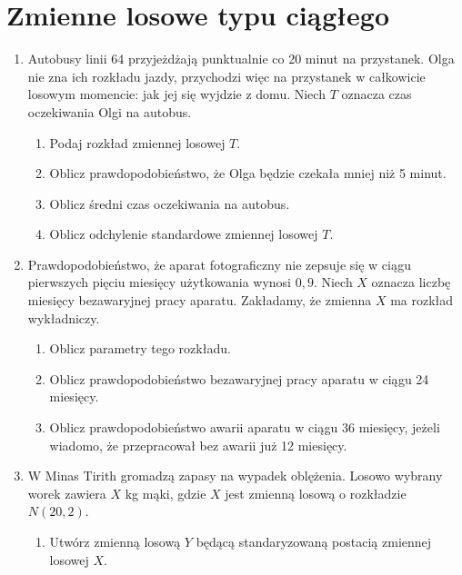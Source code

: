 \documentclass{mwart}
\newcommand{\ans}[1]{}
\newcommand{\ans}[1]{\emph{Odpowiedź:} #1}
\begin{document}
\clearpage
\section{Zmienne losowe typu ciągłego}
\begin{enumerate}
\item Autobusy linii 64 przyjeżdżają punktualnie co 20 minut na przystanek. Olga nie zna ich rozkładu jazdy, przychodzi więc na przystanek w całkowicie losowym momencie: jak jej się wyjdzie z domu. Niech $T$ oznacza czas oczekiwania Olgi na autobus.
\begin{enumerate}
\item Podaj rozkład zmiennej losowej $T$. \ans{$f(t)=\begin{cases}\frac{1}{20} & 0\leq t\leq 20 \\ 0 & \text{wpp} \end{cases}$}
\item Oblicz prawdopodobieństwo, że Olga będzie czekała mniej niż 5 minut. \ans{$P(T<5)=F(5)=0{,}25$}
\item Oblicz średni czas oczekiwania na autobus. \ans{$ET=10$}
\item Oblicz odchylenie standardowe zmiennej losowej $T$. \ans{$DT=\sqrt{\frac{400}{12}}$}
\end{enumerate}
\item Prawdopodobieństwo, że aparat fotograficzny nie zepsuje się w ciągu pierwszych pięciu miesięcy użytkowania wynosi $0{,}9$. Niech $X$ oznacza liczbę miesięcy bezawaryjnej pracy aparatu. Zakładamy, że zmienna $X$ ma rozkład wykładniczy.
\begin{enumerate}
\item Oblicz parametry tego rozkładu. \ans{$P(X>5)=\exp(-\frac{5}{\lambda}) \quad \lambda=-\frac{5}{\ln 0{,}9}$}
\item Oblicz prawdopodobieństwo bezawaryjnej pracy aparatu w ciągu 24 miesięcy. \ans{$P(X>24)=1-F(24)$}
\item Oblicz prawdopodobieństwo awarii aparatu w ciągu 36 miesięcy, jeżeli wiadomo, że przepracował bez awarii już 12 miesięcy. \ans{$P(X<36|X>12)=P(X<36-12)=F(24)$}
\end{enumerate}
\item W Minas Tirith gromadzą zapasy na wypadek oblężenia. Losowo wybrany worek zawiera $X$ kg mąki, gdzie $X$ jest zmienną losową o rozkładzie $N(20,2)$.
\begin{enumerate}
\item Utwórz zmienną losową $Y$ będącą standaryzowaną postacią zmiennej losowej $X$. \ans{$Y=\frac{X-20}{2}$}

\end{enumerate}
\end{enumerate}
\end{document}
